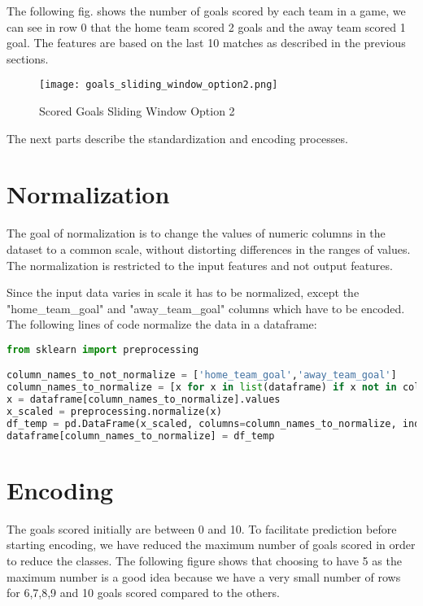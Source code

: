 The following fig. shows the number of goals scored by each team in a game, we can see in row 0 that the home team scored 2 goals and the away team scored 1 goal. The features are based on the last 10 matches as described in the previous sections.


\begin{figure}[H]
\begin{center}
\texttt{[image: goals\_sliding\_window\_option2.png]}
\end{center}
\caption{Scored Goals Sliding Window Option 2}
\label{fig:sliding_window_option1}
\end{figure}

The next parts describe the standardization and encoding processes.


\section {Normalization}
The goal of normalization is to change the values of numeric columns in the dataset to a common scale, without distorting differences in the ranges of values. The normalization is restricted to the input features and not output features.

Since the input data varies in scale it has to be normalized, except the "home\_team\_goal" and "away\_team\_goal" columns which have to be encoded.
The following lines of code normalize the data in a dataframe:

\begin{lstlisting}[language=Python, caption=Scored goals Python code for normalization]
from sklearn import preprocessing

column_names_to_not_normalize = ['home_team_goal','away_team_goal']
column_names_to_normalize = [x for x in list(dataframe) if x not in column_names_to_not_normalize ]
x = dataframe[column_names_to_normalize].values
x_scaled = preprocessing.normalize(x)
df_temp = pd.DataFrame(x_scaled, columns=column_names_to_normalize, index = dataframe.index)
dataframe[column_names_to_normalize] = df_temp
\end{lstlisting}


\section {Encoding}

The goals scored initially are between 0 and 10.
To facilitate prediction before starting encoding, we have reduced the maximum number of goals scored in order to reduce the classes. The following figure shows that choosing to have 5 as the maximum number is a good idea because we have a very small number of rows for 6,7,8,9 and 10 goals scored compared to the others.

